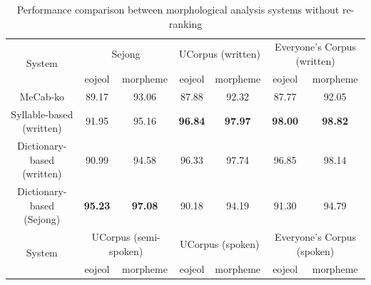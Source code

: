 \documentclass[AMS,STIX2COL]{WileyNJD-v2}
\begin{document}
    \begin{table}[ht]
        \caption{Performance comparison between morphological analysis systems without re-ranking}
        \label{tab:performance-without-reranking}
        \begin{tabular*}{500pt}{@{\extracolsep\fill}c|cccccc@{\extracolsep\fill}}
            \toprule
            \multirow{2}{*}{System}                & \multicolumn{2}{c}{Sejong}                                & \multicolumn{2}{c}{UCorpus (written)}                     & \multicolumn{2}{c}{Everyone's Corpus (written)}           \\
            \cmidrule{2-3} \cmidrule{4-5} \cmidrule{6-7}
            ~                                      & \multicolumn{1}{c}{eojeol} & \multicolumn{1}{c}{morpheme} & \multicolumn{1}{c}{eojeol} & \multicolumn{1}{c}{morpheme} & \multicolumn{1}{c}{eojeol} & \multicolumn{1}{c}{morpheme} \\
            \midrule
            \hspace{2mm}MeCab-ko                   & 89.17                      & 93.06                        & 87.88                      & 92.32                        & 87.77                      & 92.05                        \\
            \hspace{2mm}Syllable-based (written)   & 91.95                      & 95.16                        & \textbf{96.84}             & \textbf{97.97}               & \textbf{98.00}             & \textbf{98.82}               \\
            \hspace{2mm}Dictionary-based (written) & 90.99                      & 94.58                        & 96.33                      & 97.74                        & 96.85                      & 98.14                        \\
            \hspace{2mm}Dictionary-based (Sejong)  & \textbf{95.23}             & \textbf{97.08}               & 90.18                      & 94.19                        & 91.30                      & 94.79                        \\
            \toprule
            \multirow{2}{*}{System}                & \multicolumn{2}{c}{UCorpus (semi-spoken)}                 & \multicolumn{2}{c}{UCorpus (spoken)}                      & \multicolumn{2}{c}{Everyone's Corpus (spoken)}            \\
            \cmidrule{2-3} \cmidrule{4-5} \cmidrule{6-7}
            ~                                      & \multicolumn{1}{c}{eojeol} & \multicolumn{1}{c}{morpheme} & \multicolumn{1}{c}{eojeol} & \multicolumn{1}{c}{morpheme} & \multicolumn{1}{c}{eojeol} & \multicolumn{1}{c}{morpheme} \\

\end{tabular*}
\end{table}
\end{document}
